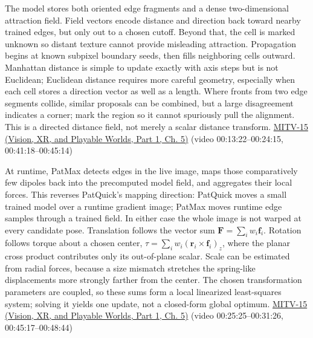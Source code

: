 The model stores both oriented edge fragments and a dense two-dimensional attraction field. Field vectors encode distance and direction back toward nearby trained edges, but only out to a chosen cutoff. Beyond that, the cell is marked unknown so distant texture cannot provide misleading attraction. Propagation begins at known subpixel boundary seeds, then fills neighboring cells outward. Manhattan distance is simple to update exactly with axis steps but is not Euclidean; Euclidean distance requires more careful geometry, especially when each cell stores a direction vector as well as a length. Where fronts from two edge segments collide, similar proposals can be combined, but a large disagreement indicates a corner; mark the region so it cannot spuriously pull the alignment. This is a directed distance field, not merely a scalar distance transform. \href{../07-Vision-XR-and-Playable-Worlds-P01/main.pdf\#nameddest=04-visual-computing-ii-ch036-mitv-15---alignment-patmax-distance-field-filtering-and-sub-sampling-us-7065262}{MITV-15 (Vision, XR, and Playable Worlds, Part 1, Ch. 5)} (video 00:13:22--00:24:15, 00:41:18--00:45:14)

At runtime, PatMax detects edges in the live image, maps those comparatively few dipoles back into the precomputed model field, and aggregates their local forces. This reverses PatQuick's mapping direction: PatQuick moves a small trained model over a runtime gradient image; PatMax moves runtime edge samples through a trained field. In either case the whole image is not warped at every candidate pose. Translation follows the vector sum \(\mathbf{F}=\sum_i w_i\mathbf{f}_i\). Rotation follows torque about a chosen center, \(\tau=\sum_i w_i(\mathbf{r}_i\times\mathbf{f}_i)_z\), where the planar cross product contributes only its out-of-plane scalar. Scale can be estimated from radial forces, because a size mismatch stretches the spring-like displacements more strongly farther from the center. The chosen transformation parameters are coupled, so these sums form a local linearized least-squares system; solving it yields one update, not a closed-form global optimum. \href{../07-Vision-XR-and-Playable-Worlds-P01/main.pdf\#nameddest=04-visual-computing-ii-ch036-mitv-15---alignment-patmax-distance-field-filtering-and-sub-sampling-us-7065262}{MITV-15 (Vision, XR, and Playable Worlds, Part 1, Ch. 5)} (video 00:25:25--00:31:26, 00:45:17--00:48:44)

